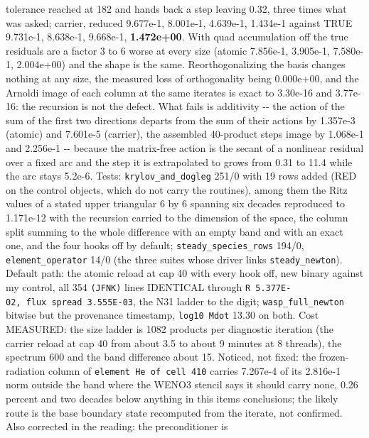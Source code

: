 \documentclass[english,a4paper]{my_memo}
\begin{document}
\begin{itemize}
  tolerance reached at 182 and hands back a step leaving 0.32, three times
  what was asked; carrier, reduced 9.677e-1, 8.001e-1, 4.639e-1, 1.434e-1
  against TRUE 9.731e-1, 8.638e-1, 9.668e-1, \textbf{1.472e+00}. With quad
  accumulation off the true residuals are a factor 3 to 6 worse at every size
  (atomic 7.856e-1, 3.905e-1, 7.580e-1, 2.004e+00) and the shape is the
  same. Reorthogonalizing the basis changes nothing at any size, the
  measured loss of orthogonality being 0.000e+00, and the
  Arnoldi image of each column at the same iterates is exact to 3.30e-16 and 3.77e-16: the
  recursion is not the defect. What fails is additivity -\/- the action of
  the sum of the first two directions departs from the sum of their actions
  by 1.357e-3 (atomic) and 7.601e-5 (carrier), the assembled 40-product
  step\textquotesingle s image by 1.068e-1 and 2.256e-1 -\/- because the matrix-free action
  is the secant of a nonlinear residual over a fixed arc and the step it is
  extrapolated to grows from 0.31 to 11.4 while the arc stays 5.2e-6. Tests:
  \texttt{krylov\_and\_dogleg} 251/0 with 19 rows added (RED on the control objects,
  which do not carry the routines), among them the Ritz values of a stated
  upper triangular 6 by 6 spanning six decades reproduced to 1.171e-12 with
  the recursion carried to the dimension of the space, the column split
  summing to the whole difference with an empty band and with an exact one,
  and the four hooks off by default; \texttt{steady\_species\_rows} 194/0,
  \texttt{element\_operator} 14/0 (the three suites whose driver links
  \texttt{steady\_newton}). Default path: the atomic reload at cap 40 with every
  hook off, new binary against my control, all 354 \texttt{(JFNK)} lines
  IDENTICAL through \texttt{\textbar{}\textbar{}R\textbar{}\textbar{}\ 5.377E-02,\ flux\ spread\ 3.555E-03}, the N31
  ladder to the digit; \texttt{wasp\_full\_newton} bitwise but the provenance
  timestamp, \texttt{log10\ Mdot} 13.30 on both. Cost MEASURED: the size ladder is
  1082 products per diagnostic iteration (the carrier reload at cap 40 from
  about 3.5 to about 9 minutes at 8 threads), the spectrum 600 and the band
  difference about 15. Noticed, not fixed: the frozen-radiation column of
  \texttt{element\ He\ of\ cell\ 410} carries 7.267e-4 of its 2.816e-1 norm outside
  the band where the WENO3 stencil says it should carry none, 0.26 percent
  and two decades below anything in this item\textquotesingle s conclusions; the likely
  route is the base boundary state recomputed from the iterate, not
  confirmed. Also corrected in the reading: the preconditioner is

\end{itemize}
\end{document}
